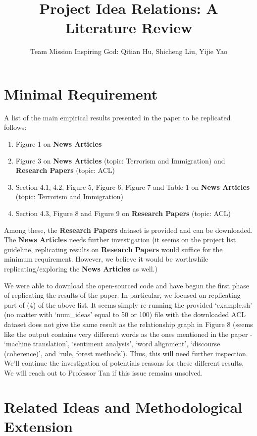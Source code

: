 \documentclass{article}
\title{ Project Idea Relations: A Literature Review }
\author{Team Mission Inspiring God: Qitian Hu, Shicheng Liu, Yijie Yao}
\begin{document}
\maketitle 

\section{Minimal Requirement}

A list of the main empirical results presented in the paper to be replicated
\cite{original} follows:

\begin{enumerate}
  \item Figure 1 on \textbf{News Articles}
  \item Figure 3 on \textbf{News Articles} (topic: Terrorism and Immigration)
   and \textbf{Research Papers} (topic: ACL)
  \item Section 4.1, 4.2, Figure 5, Figure 6, Figure 7 and Table 1 on 
  \textbf{News Articles} (topic: Terrorism and Immigration)
  \item Section 4.3, Figure 8 and Figure 9 on \textbf{Research Papers} 
  (topic: ACL)
\end{enumerate}

Among these, the \textbf{Research Papers} dataset is provided and can be downloaded. 
The \textbf{News Articles} needs further investigation (it seems on the 
project list guideline, replicating results on \textbf{Research Papers}
would suffice for the minimum requirement. However, we believe it would be
worthwhile replicating/exploring the \textbf{News Articles} as well.)

We were able to download the open-sourced code and have begun the first phase of replicating
the results of the paper. In particular, we focused on replicating part of (4)
of the above list. It seems simply re-running the provided `example.sh'
(no matter with `num\_ideas' equal to 50 or 100)
file with the downloaded ACL dataset does not give the same result as the
relationship graph in Figure 8 (seems like the output contains very different
words as the ones mentioned in the paper - `machine translation', 
`sentiment analysis', `word alignment', `discourse (coherence)', and 
`rule, forest methods'). Thus, this will need further inspection. We'll continue
the investigation of potentials reasons for these different results. We will reach out to Professor Tan if this issue remains unsolved.

\section{Related Ideas and Methodological Extension}
\end{document}
